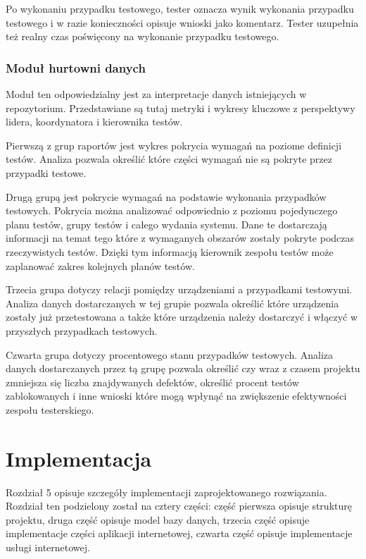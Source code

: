 Po wykonaniu przypadku testowego, tester oznacza wynik wykonania przypadku testowego i w razie konieczności opisuje wnioski jako komentarz. Tester uzupełnia też realny czas poświęcony na wykonanie przypadku testowego.

\subsection{ Moduł hurtowni danych  }

Moduł ten odpowiedzialny jest za interpretacje danych istniejących w repozytorium. Przedstawiane są tutaj metryki i wykresy kluczowe z perspektywy lidera, koordynatora i kierownika testów.

Pierwszą z grup raportów jest wykres pokrycia wymagań na poziome definicji testów. Analiza pozwala określić które części wymagań nie są pokryte przez przypadki testowe.

Drugą grupą jest pokrycie wymagań na podstawie wykonania przypadków testowych. Pokrycia można analizować odpowiednio z poziomu pojedynczego planu testów, grupy testów i całego wydania systemu. Dane te dostarczają informacji na temat tego które z wymaganych obszarów zostały pokryte podczas rzeczywistych testów. Dzięki tym informacją kierownik zespołu testów może zaplanować zakres kolejnych planów testów.

Trzecia grupa dotyczy relacji pomiędzy urządzeniami a przypadkami testowymi. Analiza danych dostarczanych w tej grupie pozwala określić które urządzenia zostały już przetestowana a także które urządzenia należy dostarczyć i włączyć w przyszłych przypadkach testowych.

Czwarta grupa dotyczy procentowego stanu przypadków testowych. Analiza danych dostarczanych przez tą grupę pozwala określić czy wraz z czasem projektu zmniejsza się liczba znajdywanych defektów, określić procent testów zablokowanych i inne wnioski które mogą wpłynąć na zwiększenie efektywności zespołu testerskiego.



\chapter{Implementacja}

Rozdział 5 opisuje szczegóły implementacji zaprojektowanego rozwiązania. Rozdział ten podzielony został na cztery części: część pierwsza opisuje strukturę projektu, druga część opisuje model bazy danych, trzecia część opisuje implementacje części aplikacji internetowej, czwarta część opisuje implementacje usługi internetowej.

